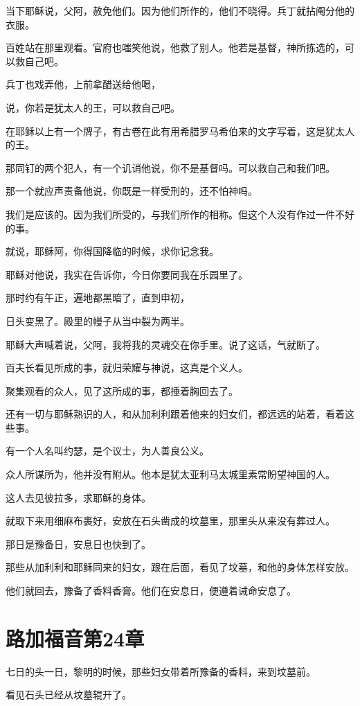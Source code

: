 \documentclass[12pt,oneside]{book}
\begin{document}
当下耶稣说，父阿，赦免他们。因为他们所作的，他们不晓得。兵丁就拈阄分他的衣服。

百姓站在那里观看。官府也嗤笑他说，他救了别人。他若是基督，神所拣选的，可以救自己吧。

兵丁也戏弄他，上前拿醋送给他喝，

说，你若是犹太人的王，可以救自己吧。

在耶稣以上有一个牌子，有古卷在此有用希腊罗马希伯来的文字写着，这是犹太人的王。

那同钉的两个犯人，有一个讥诮他说，你不是基督吗。可以救自己和我们吧。

那一个就应声责备他说，你既是一样受刑的，还不怕神吗。

我们是应该的。因为我们所受的，与我们所作的相称。但这个人没有作过一件不好的事。

就说，耶稣阿，你得国降临的时候，求你记念我。

耶稣对他说，我实在告诉你，今日你要同我在乐园里了。

那时约有午正，遍地都黑暗了，直到申初，

日头变黑了。殿里的幔子从当中裂为两半。

耶稣大声喊着说，父阿，我将我的灵魂交在你手里。说了这话，气就断了。

百夫长看见所成的事，就归荣耀与神说，这真是个义人。

聚集观看的众人，见了这所成的事，都捶着胸回去了。

还有一切与耶稣熟识的人，和从加利利跟着他来的妇女们，都远远的站着，看着这些事。

有一个人名叫约瑟，是个议士，为人善良公义。

众人所谋所为，他并没有附从。他本是犹太亚利马太城里素常盼望神国的人。

这人去见彼拉多，求耶稣的身体。

就取下来用细麻布裹好，安放在石头凿成的坟墓里，那里头从来没有葬过人。

那日是豫备日，安息日也快到了。

那些从加利利和耶稣同来的妇女，跟在后面，看见了坟墓，和他的身体怎样安放。

他们就回去，豫备了香料香膏。他们在安息日，便遵着诫命安息了。

\chapter{路加福音第24章}
七日的头一日，黎明的时候，那些妇女带着所豫备的香料，来到坟墓前。

看见石头已经从坟墓辊开了。
\end{document}
